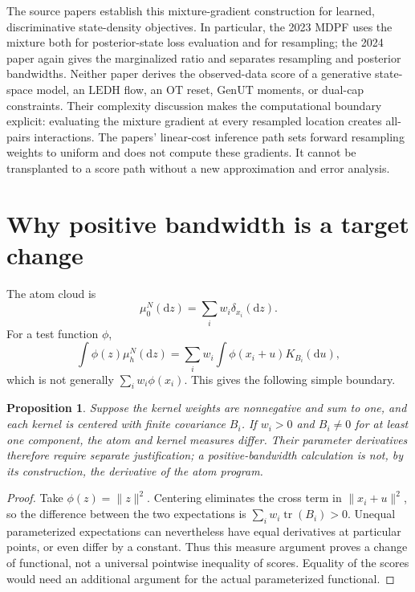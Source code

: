 \documentclass[11pt]{article}
\newtheorem{proposition}{Proposition}
\newcommand{\dd}{\mathrm{d}}
\newcommand{\LEDH}{\ensuremath{\mathrm{LEDH}}}
\newcommand{\GenUT}{\ensuremath{\mathrm{GenUT}}}
\newcommand{\OT}{\ensuremath{\mathrm{OT}}}
\begin{document}
The source papers establish this mixture-gradient construction for learned,
discriminative state-density objectives.  In particular, the 2023 MDPF uses
the mixture both for posterior-state loss evaluation and for resampling; the
2024 paper again gives the marginalized ratio and separates resampling and
posterior bandwidths.  Neither paper derives the observed-data score of a
generative state-space model, an \LEDH{} flow, an \OT{} reset, \GenUT{}
moments, or dual-cap constraints.  Their complexity discussion makes the
computational boundary explicit: evaluating the mixture gradient at every
resampled location creates all-pairs interactions.  The papers' linear-cost
inference path sets forward resampling weights to uniform and does not compute
these gradients.  It cannot be transplanted to a score path without a new
approximation and error analysis.

\section{Why positive bandwidth is a target change}

The atom cloud is
\begin{equation}
 \mu_0^N(\dd z)=\sum_i w_i\delta_{x_i}(\dd z).
 \label{eq:atom-measure}
\end{equation}
For a test function $\phi$,
\begin{equation}
 \int\phi(z)\mu_h^N(\dd z)
 =\sum_i w_i\int\phi(x_i+u)K_{B_i}(\dd u),
 \label{eq:smoothed-functional}
\end{equation}
which is not generally $\sum_i w_i\phi(x_i)$.  This gives the following
simple boundary.

\begin{proposition}
Suppose the kernel weights are nonnegative and sum to one, and each kernel
is centered with finite covariance $B_i$. If $w_i>0$ and $B_i\ne0$ for at
least one component, the atom and kernel measures differ. Their parameter
derivatives therefore require separate justification; a positive-bandwidth
calculation is not, by its construction, the derivative of the atom program.
\end{proposition}

\begin{proof}
Take $\phi(z)=\|z\|^2$. Centering eliminates the cross term in
$\|x_i+u\|^2$, so the difference between the two expectations is
$\sum_i w_i\operatorname{tr}(B_i)>0$. Unequal parameterized expectations
can nevertheless have equal derivatives at particular points, or even differ
by a constant. Thus this measure argument proves a change of functional, not
a universal pointwise inequality of scores. Equality of the scores would need
an additional argument for the actual parameterized functional.
\end{proof}
\end{document}
